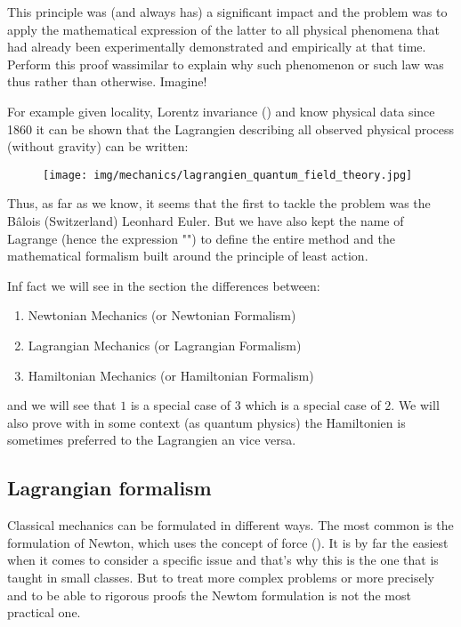 	This principle was (and always has) a significant impact and the problem was to apply the mathematical expression of the latter to all physical phenomena that had already been experimentally demonstrated and empirically at that time. Perform this proof wassimilar to explain why such phenomenon or such law was thus rather than otherwise. Imagine!
	
	For example given locality, Lorentz invariance () and know physical data since 1860 it can be shown that the Lagrangien describing all observed physical process (without gravity) can be written:
	\begin{figure}[H]
		\centering
		\texttt{[image: img/mechanics/lagrangien\_quantum\_field\_theory.jpg]}
	\end{figure}
	
	Thus, as far as we know, it seems that the first to tackle the problem was the Bâlois  (Switzerland) Leonhard Euler. But we have also kept the name of Lagrange (hence the expression "") to define the entire method and the mathematical formalism built around the principle of least action.
	
	Inf fact we will see in the section the differences between:
	\begin{enumerate}
		\item Newtonian Mechanics (or Newtonian Formalism)
		\item Lagrangian Mechanics (or Lagrangian Formalism)
		\item Hamiltonian Mechanics (or Hamiltonian Formalism)
	\end{enumerate}
	and we will see that $1$ is a special case of $3$ which is a special case of $2$. We will also prove with in some context (as quantum physics) the Hamiltonien is sometimes preferred to the Lagrangien an vice versa.
	
	\subsection{Lagrangian formalism}
	Classical mechanics can be formulated in different ways. The most common is the formulation of Newton, which uses the concept of force (). It is by far the easiest when it comes to consider a specific issue and that's why this is the one that is taught in small classes. But to treat more complex problems or more precisely and to be able to rigorous proofs the Newtom formulation is not the most practical one.
	

